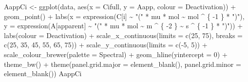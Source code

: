\documentclass[
]{krantz}
\makeatletter
\newenvironment{Shaded}{\begin{snugshade}}{\end{snugshade}}
\newcommand{\AttributeTok}[1]{\textcolor[rgb]{0.77,0.63,0.00}{#1}}
\newcommand{\DecValTok}[1]{\textcolor[rgb]{0.00,0.00,0.81}{#1}}
\newcommand{\FunctionTok}[1]{\textcolor[rgb]{0.00,0.00,0.00}{#1}}
\newcommand{\NormalTok}[1]{#1}
\newcommand{\OtherTok}[1]{\textcolor[rgb]{0.56,0.35,0.01}{#1}}
\newcommand{\SpecialCharTok}[1]{\textcolor[rgb]{0.00,0.00,0.00}{#1}}
\newcommand{\StringTok}[1]{\textcolor[rgb]{0.31,0.60,0.02}{#1}}
\newenvironment{kframe}{%
\medskip{}
\setlength{\fboxsep}{.8em}
 \def\at@end@of@kframe{}%
 \ifinner\ifhmode%
  \def\at@end@of@kframe{\end{minipage}}%
  \begin{minipage}{\columnwidth}%
 \fi\fi%
 \def\FrameCommand##1{\hskip\@totalleftmargin \hskip-\fboxsep
 \colorbox{shadecolor}{##1}\hskip-\fboxsep
     \hskip-\linewidth \hskip-\@totalleftmargin \hskip\columnwidth}%
 \MakeFramed {\advance\hsize-\width
   \@totalleftmargin\z@ \linewidth\hsize
   \@setminipage}}%
 {\par\unskip\endMakeFramed%
 \at@end@of@kframe}
\renewenvironment{Shaded}{\begin{kframe}}{\end{kframe}}
\makeatother
\begin{document}
\begin{Shaded}
\begin{Highlighting}[]
\NormalTok{AappCi }\OtherTok{\textless{}{-}}
  \FunctionTok{ggplot}\NormalTok{(data, }\FunctionTok{aes}\NormalTok{(}\AttributeTok{x =}\NormalTok{ Cifull, }\AttributeTok{y =}\NormalTok{ Aapp, }\AttributeTok{colour =}\NormalTok{ Deactivation)) }\SpecialCharTok{+}
  \FunctionTok{geom\_point}\NormalTok{() }\SpecialCharTok{+}
  \FunctionTok{labs}\NormalTok{(}\AttributeTok{x =} \FunctionTok{expression}\NormalTok{(C[i] }\SpecialCharTok{\textasciitilde{}} \StringTok{"("} \SpecialCharTok{*}\NormalTok{ mu }\SpecialCharTok{*}\NormalTok{ mol }\SpecialCharTok{\textasciitilde{}}\NormalTok{ mol }\SpecialCharTok{\^{}}\NormalTok{ \{}
    \SpecialCharTok{{-}}\DecValTok{1}
\NormalTok{  \} }\SpecialCharTok{*} \StringTok{")"}\NormalTok{),}
  \AttributeTok{y =} \FunctionTok{expression}\NormalTok{(A[apparent] }\SpecialCharTok{\textasciitilde{}} \StringTok{"("} \SpecialCharTok{*}\NormalTok{ mu }\SpecialCharTok{*}\NormalTok{ mol }\SpecialCharTok{\textasciitilde{}}\NormalTok{ m }\SpecialCharTok{\^{}}\NormalTok{ \{}
    \SpecialCharTok{{-}}\DecValTok{2}
\NormalTok{  \} }\SpecialCharTok{\textasciitilde{}}\NormalTok{ s }\SpecialCharTok{\^{}}\NormalTok{ \{}
    \SpecialCharTok{{-}}\DecValTok{1}
\NormalTok{  \} }\SpecialCharTok{*} \StringTok{")"}\NormalTok{)) }\SpecialCharTok{+}
  \FunctionTok{labs}\NormalTok{(}\AttributeTok{colour =} \StringTok{\textquotesingle{}Deactivation\textquotesingle{}}\NormalTok{) }\SpecialCharTok{+}
  \FunctionTok{scale\_x\_continuous}\NormalTok{(}\AttributeTok{limits =} \FunctionTok{c}\NormalTok{(}\DecValTok{25}\NormalTok{, }\DecValTok{75}\NormalTok{),}
                     \AttributeTok{breaks =} \FunctionTok{c}\NormalTok{(}\DecValTok{25}\NormalTok{, }\DecValTok{35}\NormalTok{, }\DecValTok{45}\NormalTok{, }\DecValTok{55}\NormalTok{, }\DecValTok{65}\NormalTok{, }\DecValTok{75}\NormalTok{)) }\SpecialCharTok{+}
  \FunctionTok{scale\_y\_continuous}\NormalTok{(}\AttributeTok{limits =} \FunctionTok{c}\NormalTok{(}\SpecialCharTok{{-}}\DecValTok{5}\NormalTok{, }\DecValTok{5}\NormalTok{)) }\SpecialCharTok{+}
  \FunctionTok{scale\_colour\_brewer}\NormalTok{(}\AttributeTok{palette =} \StringTok{\textquotesingle{}Spectral\textquotesingle{}}\NormalTok{) }\SpecialCharTok{+}
  \FunctionTok{geom\_hline}\NormalTok{(}\AttributeTok{yintercept =} \DecValTok{0}\NormalTok{) }\SpecialCharTok{+}
  \FunctionTok{theme\_bw}\NormalTok{() }\SpecialCharTok{+}
  \FunctionTok{theme}\NormalTok{(}\AttributeTok{panel.grid.major =} \FunctionTok{element\_blank}\NormalTok{(),}
        \AttributeTok{panel.grid.minor =} \FunctionTok{element\_blank}\NormalTok{())}
\NormalTok{AappCi}
\end{Highlighting}
\end{Shaded}
\end{document}
